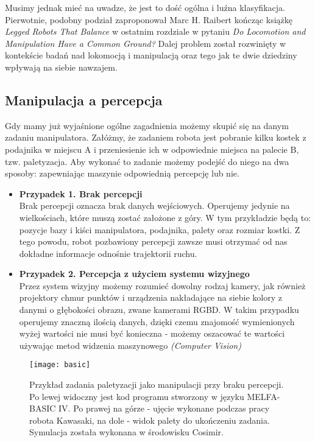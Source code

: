 \documentclass[12pt]{article}
\begin{document}
Musimy jednak mieć na uwadze, że jest to dość ogólna i luźna klasyfikacja. Pierwotnie, podobny podział zaproponował Marc H. Raibert kończąc książkę  \emph{Legged Robots That Balance} w ostatnim rozdziale w pytaniu \emph{Do Locomotion and Manipulation Have a Common Ground?} Dalej problem został rozwinięty w kontekście badań nad lokomocją i manipulacją oraz tego jak te dwie dziedziny wpływają na siebie nawzajem.

\subsection{Manipulacja a percepcja}
Gdy mamy już wyjaśnione ogólne zagadnienia możemy skupić się na danym zadaniu manipulatora. Załóżmy, że zadaniem robota jest pobranie kilku kostek z podajnika w miejscu A i przeniesienie ich w odpowiednie miejsca na palecie B, tzw. paletyzacja. Aby wykonać to zadanie możemy podejść do niego na dwa sposoby: zapewniając maszynie odpowiednią percepcję lub nie. 

\begin{itemize}
\item \textbf{Przypadek 1. Brak percepcji} \\
Brak percepcji oznacza brak danych wejściowych. Operujemy jedynie na wielkościach, które muszą zostać założone z góry. W tym przykładzie będą to: pozycje bazy i kiści manipulatora, podajnika, palety oraz rozmiar kostki. Z tego powodu, robot pozbawiony percepcji zawsze musi otrzymać od nas dokładne informacje odnośnie trajektorii ruchu.

\item \textbf{Przypadek 2. Percepcja z użyciem systemu wizyjnego} \\
Przez system wizyjny możemy rozumieć dowolny rodzaj kamery, jak również projektory chmur punktów i urządzenia nakładające na siebie kolory z danymi o głębokości obrazu, zwane kamerami RGBD. W takim przypadku operujemy znaczną ilością danych, dzięki czemu znajomość wymienionych wyżej wartości nie musi być konieczna - możemy oszacować te wartości używając metod widzenia maszynowego \emph{(Computer Vision)}
\end{itemize}

\newpage
\begin{figure}[h]
\texttt{[image: basic]}
\caption{Przykład zadania paletyzacji jako manipulacji przy braku percepcji. Po lewej widoczny jest kod programu stworzony w języku MELFA-BASIC IV. Po prawej na górze - ujęcie wykonane podczas pracy robota Kawasaki, na dole - widok palety do ukończeniu zadania. Symulacja została wykonana w środowisku Cosimir.}
\end{figure}
\end{document}
